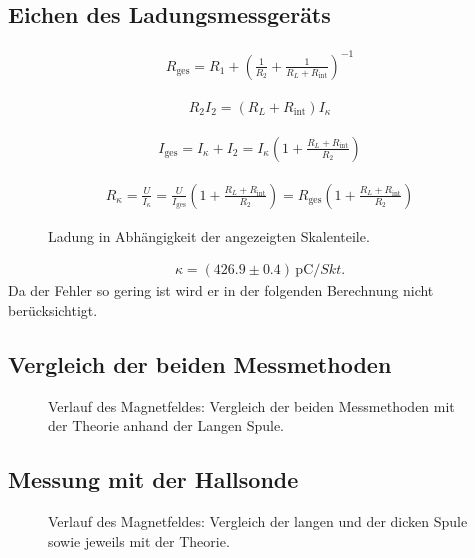 \documentclass[12pt,a4paper,titlepage,headinclude,bibtotoc]{scrartcl}
\begin{document}
\subsection{Eichen des Ladungsmessgeräts}
\begin{align}
		R_\text{ges}=R_1+\left(\frac{1}{R_2}+\frac{1}{R_L+R_\text{int}}\right)^{-1}
\end{align}

\begin{align*}
	R_2 I_2=(R_L+R_\text{int})I_\kappa
\end{align*}

\begin{align*}
	I_\text{ges}=I_\kappa+I_2=I_\kappa\left(1+\frac{R_L+R_\text{int}}{R_2}\right)
\end{align*}

\begin{align}
	R_\kappa=\frac{U}{I_\kappa}=\frac{U}{I_\text{ges}}\left(1+\frac{R_L+R_\text{int}}{R_2}\right)=R_\text{ges}\left(1+\frac{R_L+R_\text{int}}{R_2}\right)
\end{align}

\begin{figure}[!htb]
	\centering
	
	\caption{Ladung in Abhängigkeit der angezeigten Skalenteile.}
	\label{fig:Eichen}
\end{figure}

\begin{align}
	\kappa=(426.9 \pm 0.4)\,\si{\pico\coulomb\per Skt.}
\end{align}
Da der Fehler so gering ist wird er in der folgenden Berechnung nicht berücksichtigt.
\subsection{Vergleich der beiden Messmethoden}
\begin{figure}[!htb]
	\centering
	
	\caption{Verlauf des Magnetfeldes: Vergleich der beiden Messmethoden mit der Theorie anhand der Langen Spule.}
	\label{fig:LangIndHall}
\end{figure}
\subsection{Messung mit der Hallsonde}
\begin{figure}[!htb]
	\centering
	
	\caption{Verlauf des Magnetfeldes: Vergleich der langen und der dicken Spule sowie jeweils mit der Theorie.}
	\label{fig:HallVergleich}
\end{figure}
\end{document}
